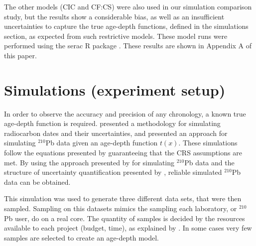 \documentclass [10pt] {article}
\begin{document}

The other models (CIC and CF:CS) were also used in our simulation comparison study, but the results show a considerable bias, as well as an insufficient uncertainties to capture the true age-depth functions, defined in the simulations section, as expected from such restrictive models.
These model runs were performed using the serac R package \citep{Bruel_2020}. 
These results are shown in Appendix A of this paper.





\section{Simulations (experiment setup)}

	In order to observe the accuracy and precision of any chronology, a known true age-depth function is required.
\citet{Blaauw2018} presented a methodology for simulating radiocarbon dates and their uncertainties, and \citet{Aquino2018} presented an approach for simulating $^{210}$Pb data given an age-depth function $t(x)$.
These simulations follow the equations presented by \cite{Appleby1978, Robbins1978} guaranteeing that the CRS assumptions are met. 
By using the approach presented by \citet{Aquino2018} for simulating $^{210}$Pb data and the structure of uncertainty quantification presented by \citet{Blaauw2018}, reliable simulated $^{210}$Pb data can be obtained.

	This simulation was used to generate three different data sets, that were then sampled. 
Sampling on this datasets mimics the sampling each laboratory, or $^{210}$Pb user, do on a real core. 
The quantity of samples is decided by the resources available to each project (budget, time), as explained by \citet{Blaauw2018}. 
In some cases very few samples are selected to create an age-depth model.
\end{document}
